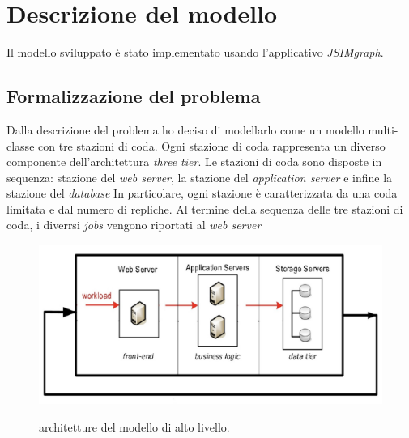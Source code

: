 \documentclass[../main.tex]{subfiles}
\begin{document}
    \chapter{Descrizione del modello}\label{ch:descrizione-del-modello}
    Il modello sviluppato è stato implementato usando l'applicativo \textit{JSIMgraph}.


    \section{Formalizzazione del problema}\label{sec:formalizzazione-del-problema}
    Dalla descrizione del problema ho deciso di modellarlo come un modello multi-classe con tre stazioni di coda.
    Ogni stazione di coda rappresenta un diverso componente dell'architettura \textit{three tier}.
    Le stazioni di coda sono disposte in sequenza: stazione del \textit{web server}, la stazione del \textit{application server} e infine la stazione del \textit{database}
    In particolare, ogni stazione è caratterizzata da una coda limitata e dal numero di repliche.
    Al termine della sequenza delle tre stazioni di coda, i diverrsi \textit{jobs} vengono riportati al \textit{web server}

    \begin{figure}[H]
        \includegraphics[scale = 0.3]{assets/three_tier}\\
        \caption[\textit{Architettura} del modello]{architetture del modello di alto livello.}
        \label{fig:architettura-alto-livello-modello}
    \end{figure}
\end{document}
